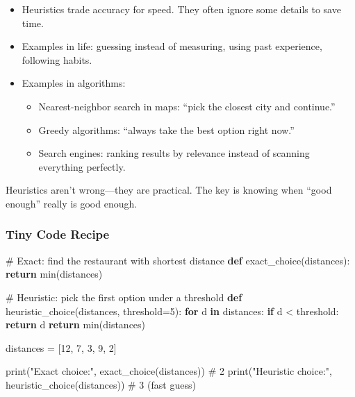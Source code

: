 \documentclass[
  letterpaper,
  DIV=11,
  numbers=noendperiod]{scrreprt}
\newenvironment{Shaded}{\begin{snugshade}}{\end{snugshade}}
\newcommand{\BuiltInTok}[1]{\textcolor[rgb]{0.00,0.23,0.31}{#1}}
\newcommand{\CommentTok}[1]{\textcolor[rgb]{0.37,0.37,0.37}{#1}}
\newcommand{\ControlFlowTok}[1]{\textcolor[rgb]{0.00,0.23,0.31}{\textbf{#1}}}
\newcommand{\DecValTok}[1]{\textcolor[rgb]{0.68,0.00,0.00}{#1}}
\newcommand{\KeywordTok}[1]{\textcolor[rgb]{0.00,0.23,0.31}{\textbf{#1}}}
\newcommand{\NormalTok}[1]{\textcolor[rgb]{0.00,0.23,0.31}{#1}}
\newcommand{\OperatorTok}[1]{\textcolor[rgb]{0.37,0.37,0.37}{#1}}
\newcommand{\StringTok}[1]{\textcolor[rgb]{0.13,0.47,0.30}{#1}}
\providecommand{\tightlist}{%
  \setlength{\itemsep}{0pt}\setlength{\parskip}{0pt}}
\begin{document}
\begin{itemize}
\item
  Heuristics trade accuracy for speed. They often ignore some details to
  save time.
\item
  Examples in life: guessing instead of measuring, using past
  experience, following habits.
\item
  Examples in algorithms:

  \begin{itemize}
  \tightlist
  \item
    Nearest-neighbor search in maps: ``pick the closest city and
    continue.''
  \item
    Greedy algorithms: ``always take the best option right now.''
  \item
    Search engines: ranking results by relevance instead of scanning
    everything perfectly.
  \end{itemize}
\end{itemize}

Heuristics aren't wrong---they are practical. The key is knowing when
``good enough'' really is good enough.

\subsubsection{Tiny Code Recipe}\label{tiny-code-recipe-80}

\begin{Shaded}
\begin{Highlighting}[]
\CommentTok{\# Exact: find the restaurant with shortest distance}
\KeywordTok{def}\NormalTok{ exact\_choice(distances):}
    \ControlFlowTok{return} \BuiltInTok{min}\NormalTok{(distances)}

\CommentTok{\# Heuristic: pick the first option under a threshold}
\KeywordTok{def}\NormalTok{ heuristic\_choice(distances, threshold}\OperatorTok{=}\DecValTok{5}\NormalTok{):}
    \ControlFlowTok{for}\NormalTok{ d }\KeywordTok{in}\NormalTok{ distances:}
        \ControlFlowTok{if}\NormalTok{ d }\OperatorTok{\textless{}}\NormalTok{ threshold:}
            \ControlFlowTok{return}\NormalTok{ d}
    \ControlFlowTok{return} \BuiltInTok{min}\NormalTok{(distances)}

\NormalTok{distances }\OperatorTok{=}\NormalTok{ [}\DecValTok{12}\NormalTok{, }\DecValTok{7}\NormalTok{, }\DecValTok{3}\NormalTok{, }\DecValTok{9}\NormalTok{, }\DecValTok{2}\NormalTok{]}

\BuiltInTok{print}\NormalTok{(}\StringTok{"Exact choice:"}\NormalTok{, exact\_choice(distances))       }\CommentTok{\# 2}
\BuiltInTok{print}\NormalTok{(}\StringTok{"Heuristic choice:"}\NormalTok{, heuristic\_choice(distances)) }\CommentTok{\# 3 (fast guess)}
\end{Highlighting}
\end{Shaded}
\end{document}
